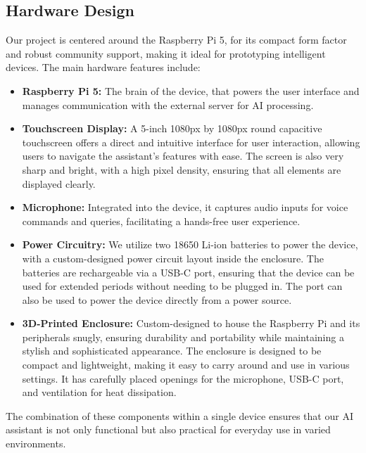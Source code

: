 \documentclass[12pt]{article}
\begin{document}
\subsection{Hardware Design}
Our project is centered around the Raspberry Pi 5, for its compact form factor and robust community support, making it ideal for prototyping intelligent devices. The main hardware features include:
\begin{itemize}
	\item \textbf{Raspberry Pi 5:} The brain of the device, that powers the user interface and manages communication with the external server for AI processing.
	\item \textbf{Touchscreen Display:} A 5-inch 1080px by 1080px round capacitive touchscreen offers a direct and intuitive interface for user interaction, allowing users to navigate the assistant's features with ease. The screen is also very sharp and bright, with a high pixel density, ensuring that all elements are displayed clearly.
	\item \textbf{Microphone:} Integrated into the device, it captures audio inputs for voice commands and queries, facilitating a hands-free user experience. 
	\item \textbf{Power Circuitry:} We utilize two 18650 Li-ion batteries to power the device, with a custom-designed power circuit layout inside the enclosure. The batteries are rechargeable via a USB-C port, ensuring that the device can be used for extended periods without needing to be plugged in. The port can also be used to power the device directly from a power source.
	\item \textbf{3D-Printed Enclosure:} Custom-designed to house the Raspberry Pi and its peripherals snugly, ensuring durability and portability while maintaining a stylish and sophisticated appearance. The enclosure is designed to be compact and lightweight, making it easy to carry around and use in various settings. It has carefully placed openings for the microphone, USB-C port, and ventilation for heat dissipation.
\end{itemize}
The combination of these components within a single device ensures that our AI assistant is not only functional but also practical for everyday use in varied environments.
\end{document}
